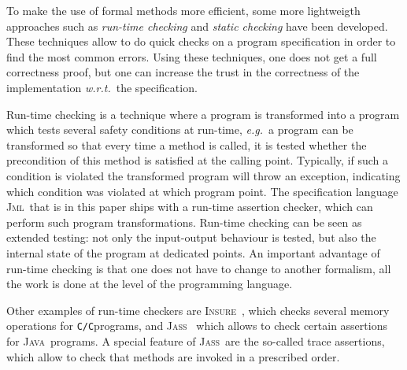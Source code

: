 \documentclass[a4paper]{llncs}
\newcommand{\jml}{\textsc{Jml}}
\newcommand{\jass}{\textsc{Jass}}
\newcommand{\java}{\textsc{Java}}
\newcommand{\cPP}{\texttt{C/C}\nolinebreak\hspace{-.05em}\raisebox{.4ex}{\tiny\bf
+}\nolinebreak\hspace{-.10em}\raisebox{.4ex}{\tiny\bf +}}
\newcommand{\insPP}{\textsc{Insure\nolinebreak\hspace{-.05em}\raisebox{.4ex}{\tiny\bf
+}\nolinebreak\hspace{-.10em}\raisebox{.4ex}{\tiny\bf +}}}
\begin{document}

To make the use of formal methods more efficient, some more
lightweigth approaches such as
\textit{run-time checking} and
\textit{static checking} have been developed. These techniques allow 
to do quick checks on a program specification in order to find the
most common errors. Using these techniques, one does not get a full
correctness proof, but one can increase the trust in the correctness
of the implementation \emph{w.r.t.}~the specification.

Run-time checking is a technique where a program is transformed into a 
program which tests several safety conditions at run-time,
\emph{e.g.}~a program can be transformed so that every time a method 
is called, it is tested whether the precondition of this method is
satisfied at the calling point. Typically, if such a condition is
violated the transformed program will throw an exception, indicating
which condition was violated at which program point. The specification
language \jml\ that is in this paper ships with a run-time assertion
checker, which can perform such program transformations. Run-time
checking can be seen as extended testing: not only the input-output
behaviour is tested, but also the internal state of the program at
dedicated points. An important advantage of run-time checking is that
one does not have to change to another formalism, all the work is done
at the level of the programming language.

Other examples of run-time checkers are \insPP~\cite{InsurePP}, which
checks several memory operations for \cPP programs, and
\jass~\cite{bartetzko01assertions} which allows to check certain
assertions for \java\ programs. A special feature of \jass\ are the
so-called trace assertions, which allow to check that methods are
invoked in a prescribed order.
\end{document}
